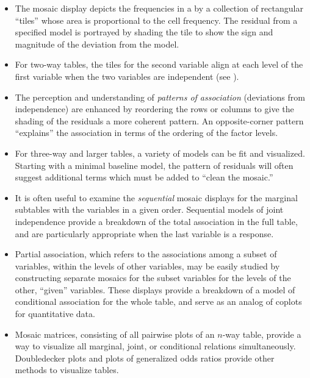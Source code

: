 \begin{itemize}
\item The mosaic display depicts the frequencies in a \ctab{} by a collection of rectangular ``tiles''
whose area is proportional to the cell frequency.
The residual from a specified model is portrayed by shading the tile
to show the sign and magnitude of the deviation from the model.

\item For two-way tables, the tiles for the second variable align
at each level of the first variable when the two variables are independent
(see ).

\item The perception and understanding of \emph{patterns of association}
(deviations from independence) are enhanced by reordering the
rows or columns to give the shading of the residuals a more
coherent pattern.  An opposite-corner pattern ``explains''
the association in terms of the ordering of the factor levels.

\item For three-way and larger tables, a variety of models can be fit
and visualized.
Starting with a minimal baseline model, the pattern of residuals
will often suggest additional terms which must be added to
``clean the mosaic.''

\item It is often useful to examine the \emph{sequential} mosaic
displays for the marginal subtables with the variables in a given order.
Sequential models of joint independence provide a breakdown of the
total association in the full table, and are particularly
appropriate when the last variable is a response.

\item Partial association, which refers to the associations among
a subset of variables, within the levels of other variables,
may be easily studied by constructing separate mosaics for the subset
variables for the levels of the other, ``given'' variables.
These displays provide a breakdown of a model of conditional association
for the whole table, and serve as an analog of coplots for quantitative
data.

\item Mosaic matrices, consisting of all pairwise plots of an $n$-way
table, provide a way to visualize all marginal, joint, or conditional 
relations simultaneously.  
Doubledecker plots and plots of generalized odds ratios provide other
methods to visualize \nway tables.


\end{itemize}
